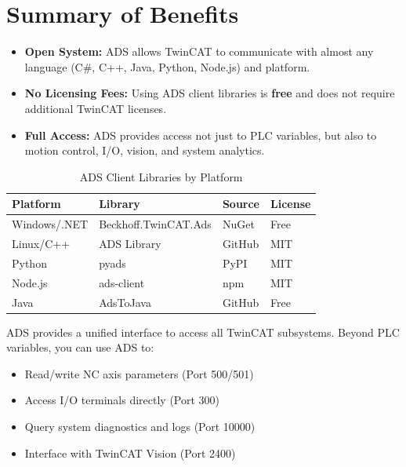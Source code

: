 \documentclass[11pt,a4paper]{article}
\begin{document}
\section{Summary of Benefits}

\begin{itemize}[leftmargin=*]
    \item \textbf{Open System:} ADS allows TwinCAT to communicate with almost any language (C\#, C++, Java, Python, Node.js) and platform.
    
    \item \textbf{No Licensing Fees:} Using ADS client libraries is \textbf{free} and does not require additional TwinCAT licenses.
    
    \item \textbf{Full Access:} ADS provides access not just to PLC variables, but also to motion control, I/O, vision, and system analytics.
\end{itemize}

\begin{table}[h]
\centering
\begin{tabular}{@{}llll@{}}
\toprule
\textbf{Platform} & \textbf{Library} & \textbf{Source} & \textbf{License} \\
\midrule
Windows/.NET & Beckhoff.TwinCAT.Ads & NuGet & Free \\
Linux/C++ & ADS Library & GitHub & MIT \\
Python & pyads & PyPI & MIT \\
Node.js & ads-client & npm & MIT \\
Java & AdsToJava & GitHub & Free \\
\bottomrule
\end{tabular}
\caption{ADS Client Libraries by Platform}
\end{table}

\begin{tipbox}
ADS provides a unified interface to access all TwinCAT subsystems. Beyond PLC variables, you can use ADS to:
\begin{itemize}
    \item Read/write NC axis parameters (Port 500/501)
    \item Access I/O terminals directly (Port 300)
    \item Query system diagnostics and logs (Port 10000)
    \item Interface with TwinCAT Vision (Port 2400)
\end{itemize}
\end{tipbox}
\end{document}
